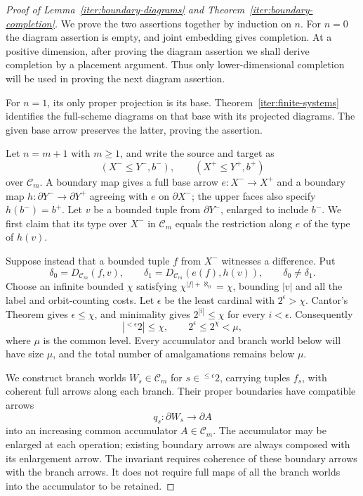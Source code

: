 \begin{proof}[Proof of Lemma~\ref{iter:boundary-diagrams} and
Theorem~\ref{iter:boundary-completion}]
We prove the two assertions together by induction on $n$.
For $n=0$ the diagram assertion is empty, and joint embedding
gives completion. At a positive dimension, after proving the
diagram assertion we shall derive completion by a placement
argument. Thus only lower-dimensional completion will be used
in proving the next diagram assertion.

For $n=1$, its only proper projection is its base.
Theorem~\ref{iter:finite-systems} identifies the full-scheme
diagrams on that base with its projected diagrams. The given
base arrow preserves the latter, proving the assertion.

Let $n=m+1$ with $m\ge1$, and write the source and target as
\[
 (X^-\le Y^-,b^-),\qquad (X^+\le Y^+,b^+)
\]
over $\mathcal C_m$. A boundary map gives a full base arrow
$e:X^-\to X^+$ and a boundary map
$h:\partial Y^-\to\partial Y^+$ agreeing with $e$ on
$\partial X^-$; the upper faces also specify
$h(b^-)=b^+$. Let $v$ be a bounded tuple from
$\partial Y^-$, enlarged to include $b^-$.
We first claim that its type over $X^-$ in $\mathcal C_m$
equals the restriction along $e$ of the type of $h(v)$.

Suppose instead that a bounded tuple $f$ from $X^-$ witnesses
a difference. Put
\[
 \delta_0=D_{\mathcal C_m}(f,v),\qquad
 \delta_1=D_{\mathcal C_m}(e(f),h(v)),
 \qquad \delta_0\ne\delta_1.
\]
Choose an infinite bounded $\chi$ satisfying
$\chi^{|f|+\aleph_0}=\chi$, bounding $|v|$ and all the
label and orbit-counting costs. Let $\epsilon$ be the least
cardinal with $2^\epsilon>\chi$. Cantor's Theorem gives
$\epsilon\le\chi$, and minimality gives $2^{|i|}\le\chi$
for every $i<\epsilon$. Consequently
\[
 \left|{}^{<\epsilon}2\right|\le\chi,
 \qquad 2^\epsilon\le 2^\chi<\mu,
\]
where $\mu$ is the common level. Every accumulator and branch
world below will have size $\mu$, and the total number of
amalgamations remains below $\mu$.

We construct branch worlds $W_s\in\mathcal C_m$ for
$s\in{}^{\le\epsilon}2$, carrying tuples $f_s$, with
coherent full arrows along each branch. Their proper
boundaries have compatible arrows
\[
 q_s:\partial W_s\longrightarrow\partial A
\]
into an increasing common accumulator $A\in\mathcal C_m$.
The accumulator may be enlarged at each operation; existing
boundary arrows are always composed with its enlargement
arrow. The invariant requires coherence of these boundary
arrows with the branch arrows. It does not require full maps
of all the branch worlds into the accumulator to be retained.


\end{proof}
